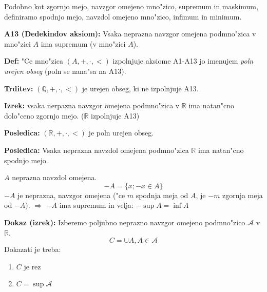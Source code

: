 Podobno kot zgornjo mejo, navzgor omejeno mno"zico, supremum in maskimum, definiramo spodnjo mejo, navzdol omejeno mno"zico, infimum in minimum.

\textbf{A13 (Dedekindov aksiom):} Vsaka neprazna navzgor omejena podmno"zica v mno"zici $A$ ima supremum (v mno"zici $A$).

\textbf{Def:} "Ce mno"zica $(A, +, \cdot, <)$ izpolnjuje aksiome A1-A13 jo imenujem \emph{poln urejen obseg} (poln se nana"sa na A13).

\textbf{Trditev:} $(\mathbb{Q}, +, \cdot, <)$ je urejen obseg, ki ne izpolnjuje A13.

\textbf{Izrek:} vsaka nerpazna navzgor omejena podmno"zica v $\mathbb{R}$ ima natan"cno dolo"ceno zgornjo mejo. ($\mathbb{R}$ izpolnjuje A13)

\textbf{Posledica:} $(\mathbb{R}, +, \cdot, <)$ je poln urejen obseg.

\textbf{Posledica:} Vsaka neprazna navzdol omejena podmno"zica $\mathbb{R}$ ima natan"cno spodnjo mejo.

$A$ neprazna navzdol omejena.
\[-A = \{x; -x \in A\}\]
$-A$ je neprazna, navzgor omejena ("ce $m$ spodnja meja od $A$, je $-m$ zgornja meja od $-A$). $\Rightarrow$ $-A$ ima supremum in velja: $-\sup A = \inf A$

\textbf{Dokaz (izrek):} Izberemo poljubno neprazno navzgor omejeno podmno"zico $\mathcal{A}$ v $\mathbb{R}$.
\[C = \cup A, A \in \mathcal{A}\]
Dokazati je treba:
\begin{enumerate}
	\item $C$ je rez
	\item $C = \sup \mathcal{A}$
\end{enumerate}


